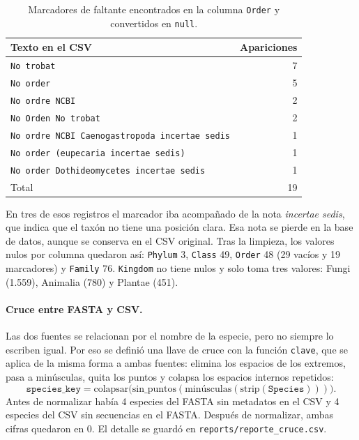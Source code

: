 \documentclass[pdflatex,lineno,referee,sn-vancouver-num]{sn-jnl}
\theoremstyle{thmstyleone}%
\theoremstyle{thmstyletwo}%
\theoremstyle{thmstylethree}%
\begin{document}
\begin{table}[htbp]
  \centering
  \caption{Marcadores de faltante encontrados en la columna \texttt{Order} y convertidos en \texttt{null}.}
  \label{tab:marcadores}
  \begin{tabular}{lr}
    \toprule
    Texto en el CSV & Apariciones \\
    \midrule
    \texttt{No trobat} & 7 \\
    \texttt{No order} & 5 \\
    \texttt{No ordre NCBI} & 2 \\
    \texttt{No Orden No trobat} & 2 \\
    \texttt{No ordre NCBI Caenogastropoda incertae sedis} & 1 \\
    \texttt{No order (eupecaria incertae sedis)} & 1 \\
    \texttt{No order Dothideomycetes incertae sedis} & 1 \\
    \midrule
    Total & 19 \\
    \bottomrule
  \end{tabular}
\end{table}

En tres de esos registros el marcador iba acompañado de la nota \textit{incertae sedis}, que indica que el taxón no tiene una posición clara. Esa nota se pierde en la base de datos, aunque se conserva en el CSV original. Tras la limpieza, los valores nulos por columna quedaron así: \texttt{Phylum} 3, \texttt{Class} 49, \texttt{Order} 48 (29 vacíos y 19 marcadores) y \texttt{Family} 76. \texttt{Kingdom} no tiene nulos y solo toma tres valores: Fungi (1.559), Animalia (780) y Plantae (451).

\paragraph{Cruce entre FASTA y CSV.} Las dos fuentes se relacionan por el nombre de la especie, pero no siempre lo escriben igual. Por eso se definió una llave de cruce con la función \texttt{clave}, que se aplica de la misma forma a ambas fuentes: elimina los espacios de los extremos, pasa a minúsculas, quita los puntos y colapsa los espacios internos repetidos:
\[
  \texttt{species\_key} = \text{colapsar}\bigl(\text{sin\_puntos}(\text{minúsculas}(\text{strip}(\texttt{Species})))\bigr).
\]
Antes de normalizar había 4 especies del FASTA sin metadatos en el CSV y 4 especies del CSV sin secuencias en el FASTA. Después de normalizar, ambas cifras quedaron en 0. El detalle se guardó en \texttt{reports/reporte\_cruce.csv}.
\end{document}
